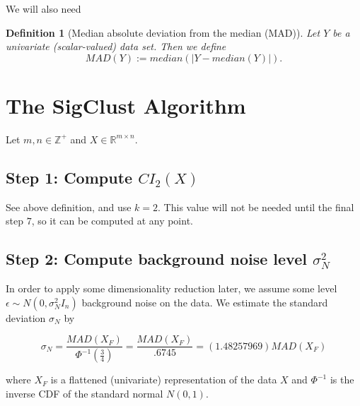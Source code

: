 \documentclass{article}
\newtheorem{definition}[theorem]{Definition}
\begin{document}
We will also need

\begin{definition}[Median absolute deviation from the median (MAD)]
Let $Y$ be a univariate (scalar-valued) data set.  Then we define
$$MAD(Y) := median(\vert Y - median(Y)\vert).$$
\end{definition}


\section{The SigClust Algorithm}
Let $m, n \in \mathbb{Z}^{+}$ and $X\in \mathbb{R}^{m \times n}$.

\subsection{Step 1:  Compute $CI_{2}(X)$}
See above definition, and use $k=2$.  This value will not be needed until the final step $7$, so it can be computed at any point. 

\subsection{Step 2: Compute background noise level $\sigma_{N}^2$}  In order to apply some dimensionality reduction later, we assume some level $\epsilon \sim N(0, \sigma^{2}_{N} I_{n})$ background noise on the data. We estimate the standard deviation $\sigma_{N}$ by

$$\sigma_{N} = \frac{MAD(X_{F})}{\Phi^{-1}(\frac{3}{4})}=\frac{MAD(X_{F})}{.6745} = (1.48257969) MAD(X_{F})$$

where $X_{F}$ is a flattened (univariate) representation of the data $X$ and $\Phi^{-1}$ is the inverse CDF of the standard normal $N(0, 1)$.


\end{document}
